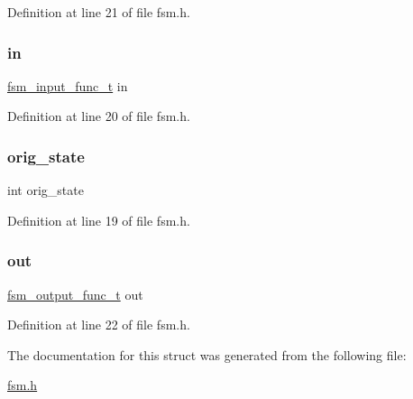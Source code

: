Definition at line 21 of file fsm.\+h.

\mbox{\label{structfsm__trans___af82b44bc4d66c5b28d20c2a10ae428c6}} 
\subsubsection{\texorpdfstring{in}{in}}
{\footnotesize\ttfamily \mbox{\hyperlink{fsm_8h_a5cf8c1afee6b2907959c75bb0ad53f38}{fsm\+\_\+input\+\_\+func\+\_\+t}} in}



Definition at line 20 of file fsm.\+h.

\mbox{\label{structfsm__trans___acfe7a3cb63b43b68f70e8b2f0bd88757}} 
\subsubsection{\texorpdfstring{orig\+\_\+state}{orig\_state}}
{\footnotesize\ttfamily int orig\+\_\+state}



Definition at line 19 of file fsm.\+h.

\mbox{\label{structfsm__trans___ac53985355b5ddaaba48ab1396e2c7240}} 
\subsubsection{\texorpdfstring{out}{out}}
{\footnotesize\ttfamily \mbox{\hyperlink{fsm_8h_ab9f0952fdbd6e84f1faa86547e1b42f5}{fsm\+\_\+output\+\_\+func\+\_\+t}} out}



Definition at line 22 of file fsm.\+h.



The documentation for this struct was generated from the following file\+:\begin{DoxyCompactItemize}
\item 
\mbox{\hyperlink{fsm_8h}{fsm.\+h}}\end{DoxyCompactItemize}

